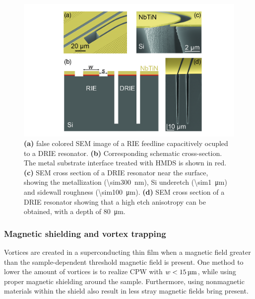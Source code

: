   \begin{figure}[h]
    \centering
    \includegraphics[width=.92\textwidth]{Figures/DRIE/DRIE figure.jpg}
    \caption{\textbf{(a)} false colored SEM image of a RIE feedline capacitively ocupled to a DRIE resonator. \textbf{(b)} Corresponding schematic cross-section. The metal substrate interface treated with HMDS is shown in red. \textbf{(c)} SEM cross section of a DRIE resonator near the surface, showing the metallization (\SI{\sim300}{\nano \meter}), Si underetch (\SI{\sim1}{\micro \meter}) and sidewall roughness (\SI{\sim100}{\micro \meter}). \textbf{(d)} SEM cross section of a DRIE resonator showing that a high etch anisotropy can be obtained, with a depth of \SI{80}{\micro \meter}.}
    \label{fig:DRIE schematic}
  \end{figure}

  \subsubsection{Magnetic shielding and vortex trapping}

  Vortices are created in a superconducting thin film when a magnetic field greater than the sample-dependent threshold magnetic field is present. One method to lower the amount of vortices is to realize CPW with $w < \text{\ensuremath{\SI{15}{\micro \meter}}}$, while using proper magnetic shielding around the sample. Furthermore, using nonmagnetic materials within the shield also result in less stray magnetic fields bring present.

